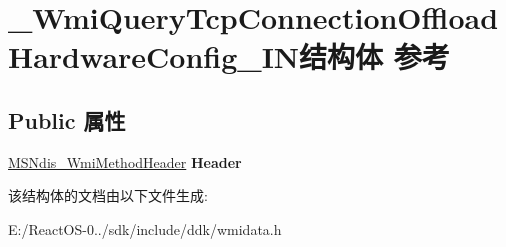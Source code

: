 \hypertarget{struct___wmi_query_tcp_connection_offload_hardware_config___i_n}{}\section{\+\_\+\+Wmi\+Query\+Tcp\+Connection\+Offload\+Hardware\+Config\+\_\+\+I\+N结构体 参考}
\label{struct___wmi_query_tcp_connection_offload_hardware_config___i_n}
\subsection*{Public 属性}
\begin{DoxyCompactItemize}
\item 
\mbox{\label{struct___wmi_query_tcp_connection_offload_hardware_config___i_n_a4109fe03d7fd523b459f0398f5ca712e}} 
\hyperlink{struct___m_s_ndis___wmi_method_header}{M\+S\+Ndis\+\_\+\+Wmi\+Method\+Header} {\bfseries Header}
\end{DoxyCompactItemize}


该结构体的文档由以下文件生成\+:\begin{DoxyCompactItemize}
\item 
E\+:/\+React\+O\+S-\/0../sdk/include/ddk/wmidata.\+h\end{DoxyCompactItemize}
